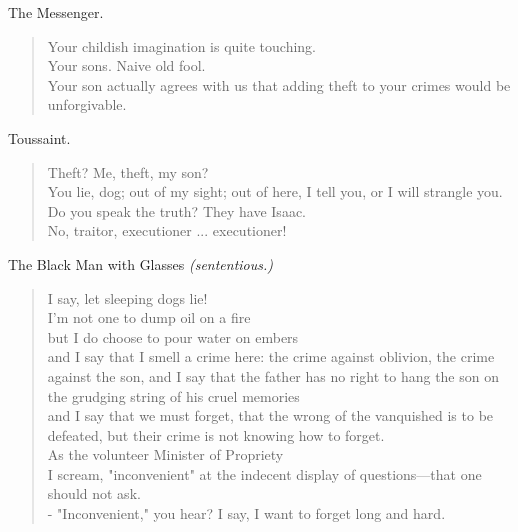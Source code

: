 \documentclass[letterpaper,article,12pt,oneside,notitlepage]{memoir}
\begin{document}
\begin{center}The Messenger.\end{center}

\begin{verse}
\hspace{1cm} Your childish imagination is quite touching. \\
Your sons. Naive old fool. \\
Your son actually agrees with us that adding theft to your crimes would be unforgivable. \\
\end{verse}

\begin{center}Toussaint.\end{center}

\begin{verse}
Theft? Me, theft, my son? \\
You lie, dog; out of my sight; out of here, I tell you, or I will strangle you. \\
Do you speak the truth? They have Isaac. \\
No, traitor, executioner ... executioner! \\
\end{verse}

\begin{center}The Black Man with Glasses \textit{(sententious.)}\end{center}

\begin{verse}
I say, let sleeping dogs lie! \\
I'm not one to dump oil on a fire \\
but I do choose to pour water on embers \\
and I say that I smell a crime here: the crime against oblivion, the crime against the son, and I say that the father has no right to hang the son on the grudging string of his cruel memories \\
and I say that we must forget, that the wrong of the vanquished is to be defeated, but their crime is not knowing how to forget.  \\
As the volunteer Minister of Propriety  \\
I scream, "inconvenient" at the indecent display of questions---that one should not ask. \\
- "Inconvenient," you hear?
I say, I want to forget long and hard. \\
\end{verse}
\end{document}
